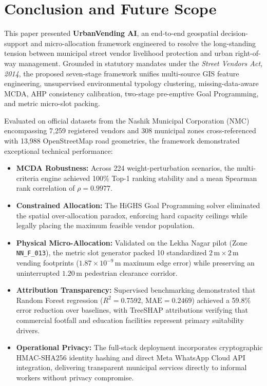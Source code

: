 \section{Conclusion and Future Scope}
\label{sec:conclusion}

This paper presented \textbf{UrbanVending AI}, an end-to-end geospatial decision-support and micro-allocation framework engineered to resolve the long-standing tension between municipal street vendor livelihood protection and urban right-of-way management. Grounded in statutory mandates under the \textit{Street Vendors Act, 2014}, the proposed seven-stage framework unifies multi-source GIS feature engineering, unsupervised environmental typology clustering, missing-data-aware MCDA, AHP consistency calibration, two-stage pre-emptive Goal Programming, and metric micro-slot packing.

Evaluated on official datasets from the Nashik Municipal Corporation (NMC) encompassing 7,259 registered vendors and 308 municipal zones cross-referenced with 13,988 OpenStreetMap road geometries, the framework demonstrated exceptional technical performance:
\begin{itemize}
    \item \textbf{MCDA Robustness:} Across 224 weight-perturbation scenarios, the multi-criteria engine achieved 100\% Top-1 ranking stability and a mean Spearman rank correlation of $\rho = 0.9977$.
    \item \textbf{Constrained Allocation:} The HiGHS Goal Programming solver eliminated the spatial over-allocation paradox, enforcing hard capacity ceilings while legally placing the maximum feasible vendor population.
    \item \textbf{Physical Micro-Allocation:} Validated on the Lekha Nagar pilot (Zone \texttt{NN\_F\_013}), the metric slot generator packed 10 standardized $2\,\text{m} \times 2\,\text{m}$ vending footprints ($1.87 \times 10^{-9}\,\text{m}$ maximum edge error) while preserving an uninterrupted $1.20\,\text{m}$ pedestrian clearance corridor.
    \item \textbf{Attribution Transparency:} Supervised benchmarking demonstrated that Random Forest regression ($R^2 = 0.7592$, $\text{MAE} = 0.2469$) achieved a 59.8\% error reduction over baselines, with TreeSHAP attributions verifying that commercial footfall and education facilities represent primary suitability drivers.
    \item \textbf{Operational Privacy:} The full-stack deployment incorporates cryptographic HMAC-SHA256 identity hashing and direct Meta WhatsApp Cloud API integration, delivering transparent municipal services directly to informal workers without privacy compromise.
\end{itemize}


